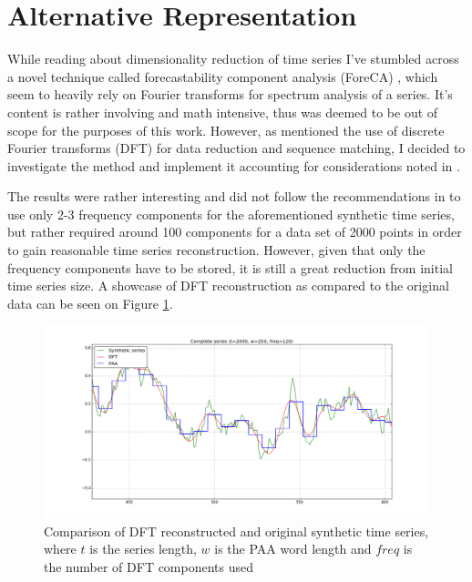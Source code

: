 \documentclass{article}
\begin{document}
\section{Alternative Representation}
While reading about dimensionality reduction of time series I've stumbled across a novel technique called forecastability component analysis (ForeCA) \cite{goerg2013forecastable} \cite{goerg2013forecastable_presentation}, which seem to heavily rely on Fourier transforms for spectrum analysis of a series. It's content is rather involving and math intensive, thus was deemed to be out of scope for the purposes of this work. However, as \cite{shieh2008sax} mentioned the use of discrete Fourier transforms (DFT) for data reduction and sequence matching, I decided to investigate the method and implement it accounting for considerations noted in \cite{faloutsos1994fast}.\par
The results were rather interesting and did not follow the recommendations in \cite{faloutsos1994fast} to use only 2-3 frequency components for the aforementioned synthetic time series, but rather required around 100 components for a data set of 2000 points in order to gain reasonable time series reconstruction. However, given that only the frequency components have to be stored, it is still a great reduction from initial time series size. A showcase of DFT reconstruction as compared to the original data can be seen on Figure \ref{fig:1}.
\begin{figure}[h!]
	\begin{center}
		\includegraphics[width=\textwidth]{images/dft-visualization}
		\caption{Comparison of DFT reconstructed and original synthetic time series, where $t$ is the series length, $w$ is the PAA word length and $freq$ is the number of DFT components used}
		\label{fig:1}
	\end{center}
\end{figure}
\end{document}
